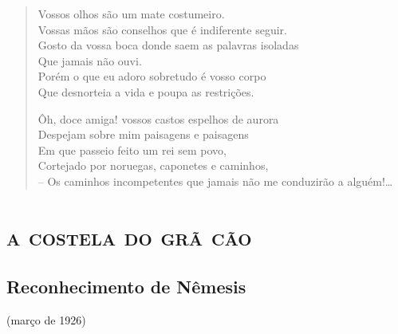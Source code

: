 \begin{verse}
Vossos olhos são um mate costumeiro.\\
Vossas mãos são conselhos que é indiferente seguir.\\
Gosto da vossa boca donde saem as palavras isoladas\\
Que jamais não ouvi.\\
Porém o que eu adoro sobretudo é vosso corpo\\
Que desnorteia a vida e poupa as restrições.

Ôh, doce amiga! vossos castos espelhos de aurora\\
Despejam sobre mim paisagens e paisagens\\
Em que passeio feito um rei sem povo,\\
Cortejado por noruegas, caponetes e caminhos,\\
-- Os caminhos incompetentes que jamais não me conduzirão a alguém!\ldots{}\\
\end{verse}


\part{\textsc{a costela do grã cão}}
\removeepigraph

\chapter{Reconhecimento de Nêmesis}{(março de 1926)}{}

